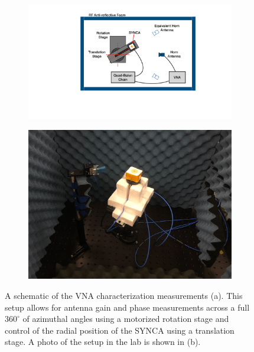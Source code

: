 \begin{figure}[t]
    \centering 
    \begin{subfigure}[b]{0.48\textwidth}
        \centering
        \includegraphics[width=\textwidth]{figs/Chapter-5/220919_vna_measurement_cartoons.pdf}
        \caption{\label{fig:vna-schematic}}
    \end{subfigure}
    \hfill
    \begin{subfigure}[b]{0.45\textwidth}
        \centering
        \includegraphics[width=\textwidth]{figs/Chapter-5/220418_measurement_lab_setup.png}
        \caption{\label{fig:lab-meas-photo}}
    \end{subfigure}
    \hfill
    \caption{\label{fig:vna-meas-schematic} A schematic of the VNA characterization measurements (a). This setup allows for antenna gain and phase measurements across a full $360^\circ$ of azimuthal angles using a motorized rotation stage and control of the radial position of the SYNCA using a translation stage. A photo of the setup in the lab is shown in (b).}
    \qquad
\end{figure}

